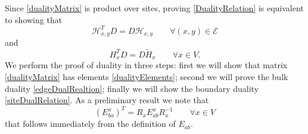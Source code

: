 \documentclass[10pt]{article}
\numberwithin{equation}{section}
\numberwithin{equation}{subsection}
\begin{document}
Since \eqref{dualityMatrix} is product over sites, proving \eqref{DualityRelation} is equivalent to showing that 
\begin{equation}\label{edgeDualRealtion}
    \mathcal{H}_{x,y}^{T}D=D\mathcal{H}_{x,y}\qquad \forall (x,y)\in \mathcal{E}
\end{equation}
and 
\begin{equation}\label{siteDualRelation}
    H_{x}^{T}D=D\widetilde{H}_{x}\qquad \forall x\in V.
\end{equation}
We perform the proof of duality in three steps: first we will show that matrix \eqref{dualityMatrix} has elements \eqref{dualityElements}; second we will prove the bulk duality \eqref{edgeDualRealtion}; finally we will show the boundary duality \eqref{siteDualRelation}. 
As a preliminary result we note that 
\begin{equation}\label{transpositionPropertyR}
(E_{ba}^{x})^{T}=R_{x}E_{ab}^{x}R_{x}^{-1}\qquad \forall x\in V
\end{equation}
that follows immediately from the definition of $E_{ab}$. 
\begin{comment}

\begin{align*}
R_{x}E_{ab}^{x}R_{x}^{-1}=&\sum_{r^{x}\in\Omega_{x}}\frac{\xi_{1}^{x}!\ldots r_{N}!}{\nu!}|\xi_{1}^{x},\ldots,\xi_{N}^{x}\rangle \langle \xi_{1}^{x},\ldots, \xi_{N}^{x}|
	\\&
	\sum_{s^{x}\in \Omega_{x},}s_{b}^{x}|s_{1}^{x},\ldots,s_{a}^{x}+1,\ldots,s_{b}^{x}-1,\ldots s_{N}^{x}\rangle \langle s_{1}^{x},\ldots,s_{N}^{x}|
	\\&
	\sum_{n^{x}\in\Omega_{x}}\frac{\nu!}{n_{1}!\ldots n_{N}!}|n_{1}^{x},\ldots,n_{N}^{x}\rangle \langle n_{1}^{x},\ldots, n_{N}^{x}|
 \\=&\sum_{r^{x}\in \Omega_{x}}
	\xi_{a}^{x}|\xi_{1}^{x},\ldots,\xi_{N}^{x}\rangle \langle \xi_{1}^{x},\ldots,\xi_{a}^{x}-1,\ldots,r_{b}^{x}-1,\ldots,\xi_{N}^{x}|
	\\=&
	\left(E_{ba}^{x}\right)^{T}
\end{align*}
where in the up to last equation we used the orthogonality relation \eqref{ortho}. 
\end{comment}
\end{document}
